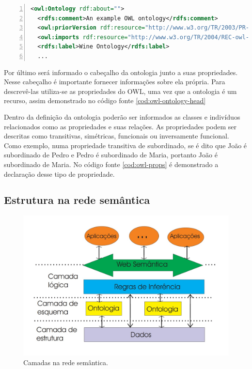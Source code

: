 \begin{lstlisting}[caption=Exemplo do cabeçalho de uma ontologia, language=XML, frame=single, label={cod:owl-ontology-head}, float, numbers=left]
<owl:Ontology rdf:about=""> 
  <rdfs:comment>An example OWL ontology</rdfs:comment>
  <owl:priorVersion rdf:resource="http://www.w3.org/TR/2003/PR-owl-guide-20031215/wine"/> 
  <owl:imports rdf:resource="http://www.w3.org/TR/2004/REC-owl-guide-20040210/food"/> 
  <rdfs:label>Wine Ontology</rdfs:label>
  ...
\end{lstlisting}

Por último será informado o cabeçalho da ontologia junto a suas propriedades. Nesse cabeçalho é importante fornecer informações sobre ela própria. Para descrevê-las utiliza-se as propriedades do OWL, uma vez que a ontologia é um recurso, assim demonstrado no código fonte \ref{cod:owl-ontology-head}

Dentro da definição da ontologia poderão ser informados as classes e indivíduos relacionados como as propriedades e suas relações. As propriedades podem ser descritas como transitivas, simétricas, funcionais ou inversamente funcional. Como exemplo, numa propriedade transitiva de subordinado, se é dito que João é subordinado de Pedro e Pedro é subordinado de Maria, portanto João é subordinado de Maria. No código fonte \ref{cod:owl-props} é demonstrado a declaração desse tipo de propriedade.

\subsection{Estrutura na rede semântica}

\begin{figure}
	\centering
	\includegraphics[scale=0.35]{imagens/sw_layers.jpg}
	\caption{Camadas na rede semântica. \citep{OWLReport:2005}}
	\label{fig:sw-layers}
\end{figure}

